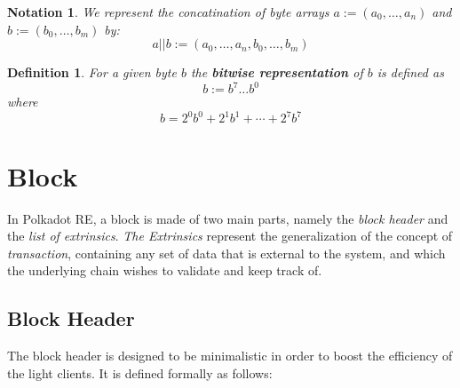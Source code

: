 \documentclass{article}
\newcommand{\assign}{:=}
\newcommand{\tmem}[1]{{\em #1\/}}
\newcommand{\tmstrong}[1]{\textbf{#1}}
\newcommand{\tmtextbf}[1]{{\bfseries{#1}}}
\newcommand{\tmtextit}[1]{{\itshape{#1}}}
\newtheorem{definition}{Definition}
\newtheorem{notation}{Notation}
\providecommand{\tmem}[1]{\tmtextit{#1}}
\providecommand{\tmstrong}[1]{\tmtextbf{#1}}
\providecommand{\tmtextbf}[1]{\tmtextbf{#1}}
\providecommand{\tmtextit}[1]{\tmtextit{#1}}
\newtheorem{definition}{Definition}
\newtheorem{notation}{Notation}
\begin{document}
\begin{notation}
  We represent the concatination of byte arrays $a \assign (a_0, \ldots, a_n)$
  and $b \assign (b_0, \ldots, b_m)$ by:
  \[ a || b \assign (a_0, \ldots, a_n, b_0, \ldots, b_m) \]
\end{notation}

\begin{definition}
  \label{defn-bit-rep}For a given byte $b$ the {\tmstrong{bitwise
  representation}} of $b$ is defined as
  \[ b \assign b^7 \ldots b^0 \]
  where
  \[ b = 2^0 b^0 + 2^1 b^1 + \cdots + 2^7 b^7 \]
\end{definition}

\section{Block}

In Polkadot RE, a block is made of two main parts, namely the \tmtextit{block
header} and the \tmtextit{list of extrinsics}. {\tmem{The Extrinsics}}
represent the generalization of the concept of {\tmem{transaction}},
containing any set of data that is external to the system, and which the
underlying chain wishes to validate and keep track of.

\subsection{Block Header}\label{block}

The block header is designed to be minimalistic in order to boost the
efficiency of the light clients. It is defined formally as follows:
\end{document}
